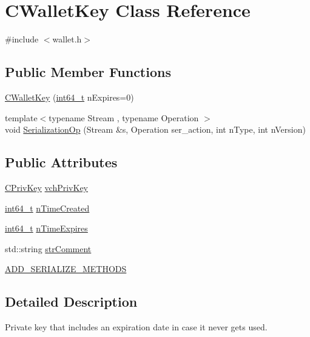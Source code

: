 \hypertarget{class_c_wallet_key}{}\section{C\+Wallet\+Key Class Reference}
\label{class_c_wallet_key}


{\ttfamily \#include $<$wallet.\+h$>$}

\subsection*{Public Member Functions}
\begin{DoxyCompactItemize}
\item 
\hyperlink{class_c_wallet_key_aa2603825b543b1d5153f31482139a6b2}{C\+Wallet\+Key} (\hyperlink{stdint_8h_adec1df1b8b51cb32b77e5b86fff46471}{int64\+\_\+t} n\+Expires=0)
\item 
{\footnotesize template$<$typename Stream , typename Operation $>$ }\\void \hyperlink{class_c_wallet_key_aa91831d60fc789bddcd7ea7339fef316}{Serialization\+Op} (Stream \&s, Operation ser\+\_\+action, int n\+Type, int n\+Version)
\end{DoxyCompactItemize}
\subsection*{Public Attributes}
\begin{DoxyCompactItemize}
\item 
\hyperlink{key_8h_a1da569b8b6e5b3fa1196cc1b877e7f54}{C\+Priv\+Key} \hyperlink{class_c_wallet_key_a28f9bbffcc9d7f2f784d5e4be8ca31f7}{vch\+Priv\+Key}
\item 
\hyperlink{stdint_8h_adec1df1b8b51cb32b77e5b86fff46471}{int64\+\_\+t} \hyperlink{class_c_wallet_key_a08e4bb5bbb690f478e3f464fdc6f26c2}{n\+Time\+Created}
\item 
\hyperlink{stdint_8h_adec1df1b8b51cb32b77e5b86fff46471}{int64\+\_\+t} \hyperlink{class_c_wallet_key_a53b6c0e78341dae728724a35dc88e258}{n\+Time\+Expires}
\item 
std\+::string \hyperlink{class_c_wallet_key_aa8804f64837126c6a28c27178eb8c220}{str\+Comment}
\item 
\hyperlink{class_c_wallet_key_a1ad8fb86fc19f29db785a471d772ed3b}{A\+D\+D\+\_\+\+S\+E\+R\+I\+A\+L\+I\+Z\+E\+\_\+\+M\+E\+T\+H\+O\+D\+S}
\end{DoxyCompactItemize}


\subsection{Detailed Description}
Private key that includes an expiration date in case it never gets used. 

